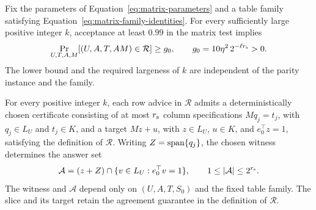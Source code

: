 \begin{lemma}
\label{lem:row-advice-agreement}
Fix the parameters of Equation~\eqref{eq:matrix-parameters} and a table
family satisfying Equation~\eqref{eq:matrix-family-identities}.
For every sufficiently large positive integer $k$, acceptance at least
$0.99$ in the matrix test implies
\begin{equation}
 \Pr_{U,T,A,M}[(U,A,T,AM)\in\mathcal R]
 \ge g_0,
 \qquad
 g_0=10\eta^2\,2^{-\ell r_{\rm s}}>0.
 \label{eq:advice-agreement-mass}
\end{equation}
The lower bound and the required largeness of $k$ are independent of the
parity instance and the family.

For every positive integer $k$, each row advice in $\mathcal R$ admits a
deterministically chosen certificate consisting of at most $r_{\rm s}$
column specifications
$Mq_j=t_j$, with $q_j\in L_U$ and $t_j\in K$, and a target $Mz+u$,
with $z\in L_U$, $u\in K$, and $e_0^\top z=1$, satisfying the definition
of $\mathcal R$.
Writing $Z=\operatorname{span}\{q_j\}$, the chosen witness determines the answer set
\begin{equation}
 \mathcal A=(z+Z)\cap\{v\in L_U:e_0^\top v=1\},
 \qquad 1\le |\mathcal A|\le 2^{r_{\rm s}}.
 \label{eq:row-answer-set}
\end{equation}
The witness and $\mathcal A$ depend only on $(U,A,T,S_0)$ and the fixed
table family.  The slice and its target retain the agreement guarantee in
the definition of $\mathcal R$.
\end{lemma}

